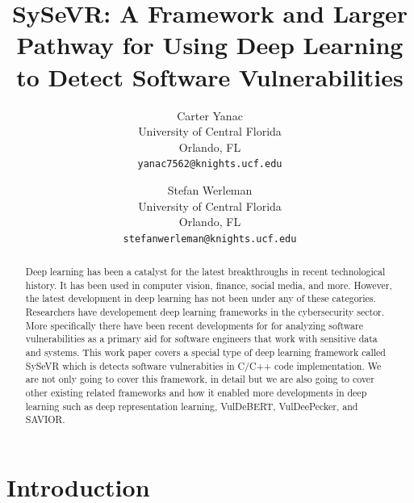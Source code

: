 \documentclass[12pt,twocolumn,letterpaper]{article}
\begin{document}
\title{SySeVR: A Framework and Larger Pathway for Using Deep Learning to Detect Software Vulnerabilities}

\author{
    Carter Yanac\\
    University of Central Florida\\
    Orlando, FL\\
    {\tt\small yanac7562@knights.ucf.edu}
    \and
    Stefan Werleman\\
    University of Central Florida\\
    Orlando, FL\\
    {\tt\small stefanwerleman@knights.ucf.edu}
}
\maketitle

\begin{abstract}
    Deep learning has been a catalyst for the latest breakthroughs in recent technological history. It has been 
    used in computer vision, finance, social media, and more. However, the latest development in deep 
    learning has not been under any of these categories. Researchers have developement deep learning 
    frameworks in the cybersecurity sector. More specifically there have been recent developments for 
    for analyzing software vulnerabilities as a primary aid for software engineers that work with sensitive 
    data and systems. This work paper covers a special type of deep learning framework called SySeVR which is 
    detects software vulnerabities in C/C++ code implementation. We are not only going to cover this framework, 
    in detail but we are also going to cover other existing related frameworks and how it enabled more 
    developments in deep learning such as deep representation learning, VulDeBERT, VulDeePecker, and SAVIOR.
\end{abstract}

\section{Introduction}
\label{sec:intro}
\end{document}
